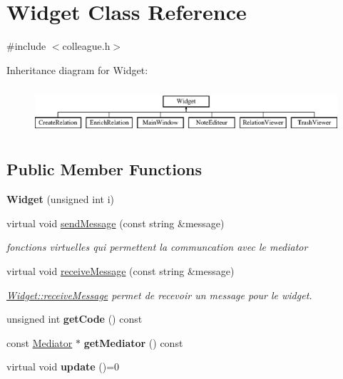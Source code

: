 \hypertarget{classWidget}{}\section{Widget Class Reference}
\label{classWidget}


{\ttfamily \#include $<$colleague.\+h$>$}

Inheritance diagram for Widget\+:\begin{figure}[H]
\begin{center}
\leavevmode
\includegraphics[height=1.777778cm]{classWidget}
\end{center}
\end{figure}
\subsection*{Public Member Functions}
\begin{DoxyCompactItemize}
\item 
\mbox{\label{classWidget_afa1760fea43981e946d64c52d7f11956}} 
{\bfseries Widget} (unsigned int i)
\item 
virtual void \hyperlink{classWidget_a3f249ee26ae63058896027c045477804}{send\+Message} (const string \&message)
\begin{DoxyCompactList}\small\item\em fonctions virtuelles qui permettent la communcation avec le mediator \end{DoxyCompactList}\item 
virtual void \hyperlink{classWidget_aa985218b1841d00fedc817d44b81b2ac}{receive\+Message} (const string \&message)
\begin{DoxyCompactList}\small\item\em \hyperlink{classWidget_aa985218b1841d00fedc817d44b81b2ac}{Widget\+::receive\+Message} permet de recevoir un message pour le widget. \end{DoxyCompactList}\item 
\mbox{\label{classWidget_a2da3cc9ed15edf1ad2340844a29aa2e1}} 
unsigned int {\bfseries get\+Code} () const
\item 
\mbox{\label{classWidget_a6451a6dc0ba268da5547a147fe909821}} 
const \hyperlink{classMediator}{Mediator} $\ast$ {\bfseries get\+Mediator} () const
\item 
\mbox{\label{classWidget_a726dc97add2c6eb82967144207280ace}} 
virtual void {\bfseries update} ()=0
\end{DoxyCompactItemize}
